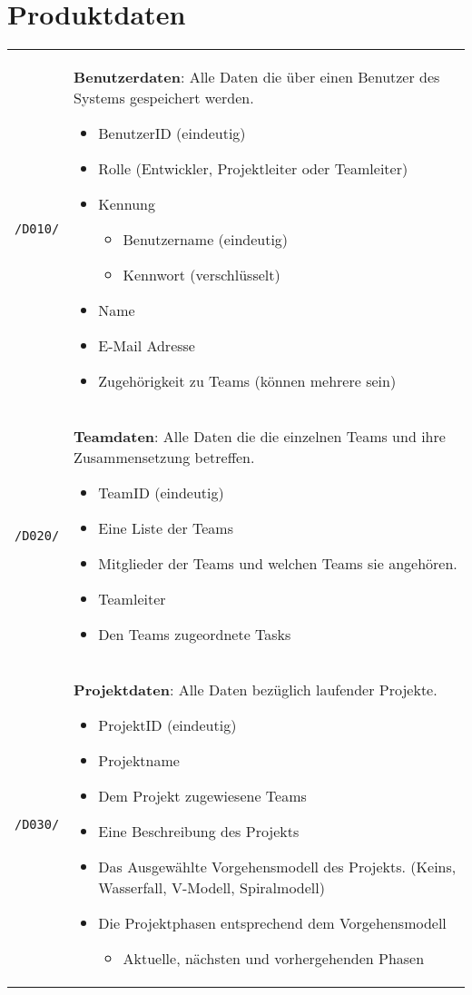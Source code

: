
\section{Produktdaten}


\begin{tabularx}{\linewidth}{s X}
	\texttt{/D010/} & \textbf{Benutzerdaten}: Alle Daten die über einen Benutzer des Systems gespeichert werden.
	\begin{itemize}
		\item BenutzerID (eindeutig)
		\item Rolle (Entwickler, Projektleiter oder Teamleiter)
		\item Kennung \begin{itemize}
			\item Benutzername (eindeutig)
			\item Kennwort (verschlüsselt)
		\end{itemize}
		\item Name
		\item E-Mail Adresse
		\item Zugehörigkeit zu Teams (können mehrere sein)
	\end{itemize}
	\\
	 \texttt{/D020/} & \textbf{Teamdaten}: Alle Daten die die einzelnen Teams und ihre Zusammensetzung betreffen.
	 \begin{itemize}
	 	\item TeamID (eindeutig)
	 	\item Eine Liste der Teams
	 	\item Mitglieder der Teams und welchen Teams sie angehören.
	 	\item Teamleiter
	 	\item Den Teams zugeordnete Tasks
	 \end{itemize}
 	\\
 	 \texttt{/D030/} & \textbf{Projektdaten}: Alle Daten bezüglich laufender Projekte.
 	 \begin{itemize}
 	 	\item ProjektID (eindeutig)
 	 	\item Projektname
 	 	\item Dem Projekt zugewiesene Teams
 	 	\item Eine Beschreibung des Projekts
 	 	\item Das Ausgewählte Vorgehensmodell des Projekts. (Keins, Wasserfall, V-Modell, Spiralmodell)
 	 	\item Die Projektphasen entsprechend dem Vorgehensmodell \begin{itemize}
 	 		\item Aktuelle, nächsten und vorhergehenden Phasen
 	 	\end{itemize}
 	 \end{itemize}
	\\
\end{tabularx}
